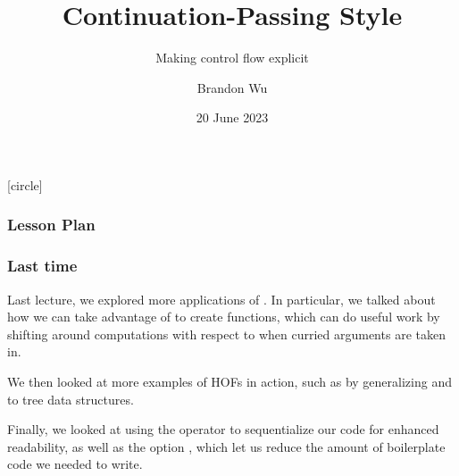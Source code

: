 \documentclass[aspectratio=169]{beamer}
\title{Continuation-Passing Style} %
\subtitle{Making control flow explicit} %
\date{20 June 2023} %
\author{Brandon Wu} %
\newif\ifcolorlambda
\begin{document}
\ifweb
    \renewcommand{\pause}{}
\fi

[circle]

{
\begin{frame}[plain]
    \colorlambdatrue
    \titlepage
\end{frame}
}

\begin{frame}[fragile]
  \frametitle{Lesson Plan}

  \tableofcontents
\end{frame}

\begin{frame}[fragile]
  \frametitle{Last time}

  Last lecture, we explored more applications of .
  In particular, we talked about how we can take advantage of 
  to create  functions, which can do useful work by shifting
  around computations with respect to when curried arguments are taken in.

  We then looked at more examples of HOFs in action, such as by generalizing
   and  to tree data structures.

  Finally, we looked at using the \code{|>} operator to sequentialize our
  code for enhanced readability, as well as the option , which
  let us reduce the amount of boilerplate code we needed to write.
\end{frame}

\end{document}
